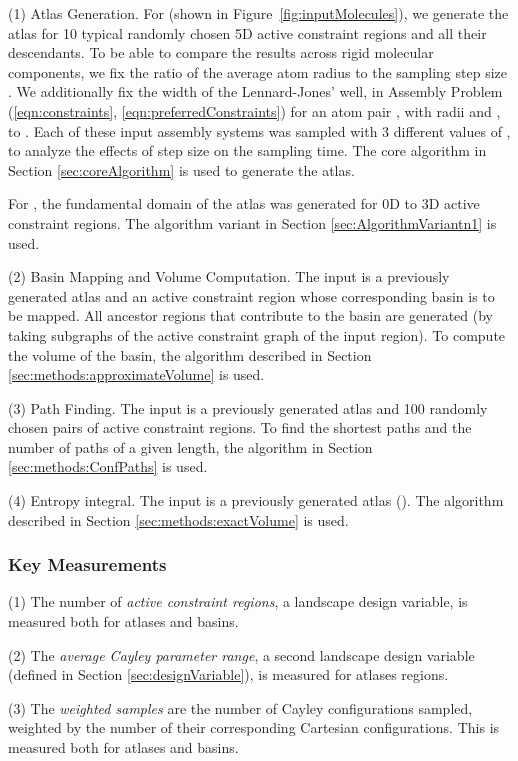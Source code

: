 \documentclass[]{article}
\newcommand{\figref}[1]{Figure~\ref{#1}}
\newcommand{\rmc}{rigid molecular component}
\newcommand{\ctwo}{\ref{eqn:preferredConstraints}}
\newcommand{\cone}{\ref{eqn:constraints}}
\begin{document}
(1) Atlas Generation. For  (shown in \figref{fig:inputMolecules}), we
generate the atlas for 10 typical randomly chosen 5D active constraint regions
and all their descendants. To be able to compare the results across \rmc s, we
fix the ratio of the average atom radius to the sampling step size .  We
additionally fix the width of the Lennard-Jones' well, 
in Assembly Problem (\cone, \ctwo) for an atom pair , with radii
 and , to . Each of these input
assembly systems was sampled with 3 different values of , to analyze the
effects of step size on the sampling time. The core algorithm in Section
\ref{sec:coreAlgorithm} is used to generate the atlas.

For , the fundamental domain of the atlas was generated for 0D to 3D
active constraint regions. The algorithm variant in Section
\ref{sec:AlgorithmVariantn1} is used. 

(2) Basin Mapping and Volume Computation. The input is a previously generated
atlas and an active constraint region whose corresponding basin is to be
mapped. All ancestor regions that contribute to the basin are generated (by
taking subgraphs of the active constraint graph of the input region). To
compute the volume of the basin, the algorithm described in Section
\ref{sec:methods:approximateVolume} is used.

(3) Path Finding. The input is a previously generated atlas and 100 randomly
chosen pairs of active constraint regions. To find the shortest paths and the
number of paths of a given length, the algorithm in Section
\ref{sec:methods:ConfPaths} is used.

(4) Entropy integral. The input is a previously generated atlas (). The
algorithm described in Section \ref{sec:methods:exactVolume} is used.

\subsubsection{Key Measurements}
\label{sec:keyMeasurements}
(1) The number of {\sl active constraint regions}, a 
landscape design variable, is measured both for atlases and basins.

(2) The {\sl average Cayley parameter range}, a second landscape design variable 
(defined in Section \ref{sec:designVariable}), is measured for 
atlases regions.

(3) The {\sl weighted samples} are the number of Cayley configurations sampled,
weighted by the number of their corresponding Cartesian configurations. This
is measured both for atlases and basins. 
\end{document}
